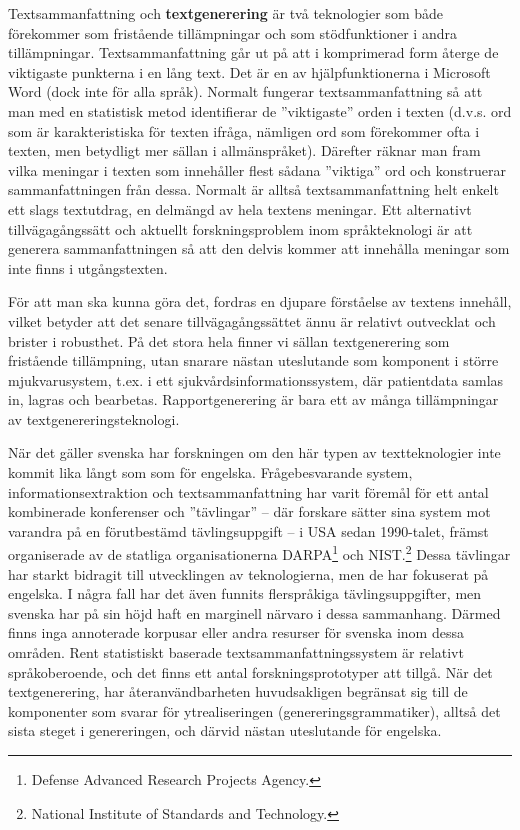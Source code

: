 \begin{multicols}{2}
Textsammanfattning och \textbf{textgenerering} är två teknologier som
både förekommer som fristående tillämpningar och som stödfunktioner i
andra tillämpningar. Textsammanfattning går ut på att i komprimerad
form återge de viktigaste punkterna i en lång text. Det är en av
hjälpfunktionerna i Microsoft Word (dock inte för alla språk). Normalt
fungerar textsammanfattning så att man med en statistisk metod
identifierar de ''viktigaste'' orden i texten (d.v.s. ord som är
karakteristiska för texten ifråga, nämligen ord som förekommer ofta i
texten, men betydligt mer sällan i allmänspråket). Därefter räknar man
fram vilka meningar i texten som innehåller flest sådana ''viktiga''
ord och konstruerar sammanfattningen från dessa. Normalt är alltså
textsammanfattning helt enkelt ett slags textutdrag, en delmängd av
hela textens meningar. Ett alternativt tillvägagångssätt och aktuellt
forskningsproblem inom språkteknologi är att generera sammanfattningen
så att den delvis kommer att innehålla meningar som inte finns i
utgångstexten.


För att man ska kunna göra det, fordras en djupare förståelse av
textens innehåll, vilket betyder att det senare tillvägagångssättet
ännu är relativt outvecklat och brister i robusthet. På det stora hela
finner vi sällan textgenerering som fristående tillämpning, utan
snarare nästan uteslutande som komponent i större mjukvarusystem,
t.ex. i ett sjuk\-vårds\-informa\-tions\-system, där patient\-data
samlas in, lagras och bearbetas. Rapport\-generering är bara ett av
många tillämpningar av text\-genererings\-tekno\-logi.

När det gäller svenska har forskningen om den här typen av
textteknologier inte kommit lika långt som som för
engelska. Frågebesvarande system, informationsextraktion och
textsammanfattning har varit föremål för ett antal kombinerade
konferenser och ''tävlingar'' -- där forskare sätter sina system mot
varandra på en förutbestämd tävlingsuppgift -- i USA sedan 1990-talet,
främst organiserade av de statliga organisationerna
DARPA\footnote{Defense Advanced Research Projects Agency.} och
NIST.\footnote{National Institute of Standards and Technology.} Dessa
tävlingar har starkt bidragit till utvecklingen av teknologierna, men
de har fokuserat på engelska. I några fall har det även funnits
flerspråkiga tävlingsuppgifter, men svenska har på sin höjd haft en
marginell närvaro i dessa sammanhang. Därmed finns inga annoterade
korpusar eller andra resurser för svenska inom dessa områden. Rent
statistiskt baserade textsammanfattningssystem är relativt
språkoberoende, och det finns ett antal forskningsprototyper att
tillgå. När det textgenerering, har återanvändbarheten huvudsakligen
begränsat sig till de komponenter som svarar för ytrealiseringen
(genereringsgrammatiker), alltså det sista steget i genereringen, och
därvid nästan uteslutande för engelska.



\end{multicols}
